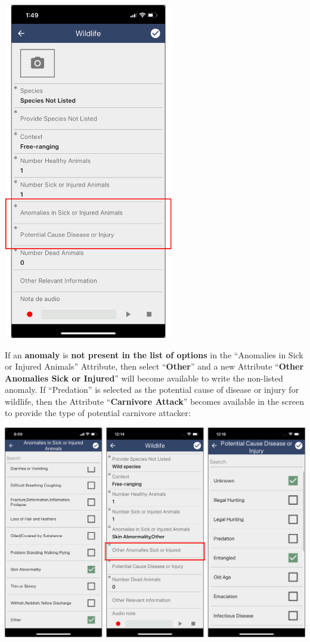 \documentclass[
  letterpaper,
  DIV=11,
  numbers=noendperiod]{scrreprt}
\begin{document}
\includegraphics[width=2.91667in,height=\textheight]{Pictures_for_manual/Picture11.png}

If an \textbf{anomaly} is \textbf{not present in the list of options} in
the ``Anomalies in Sick or Injured Animals'' Attribute, then select
``\textbf{Other}'' and a new Attribute ``\textbf{Other Anomalies Sick or
Injured}'' will become available to write the non-listed anomaly. If
``Predation'' is selected as the potential cause of disease or injury
for wildlife, then the Attribute ``\textbf{Carnivore Attack}'' becomes
available in the screen to provide the type of potential carnivore
attacker:

\includegraphics[width=8.75in,height=\textheight]{Pictures_for_manual/Picture12.png}
\end{document}
